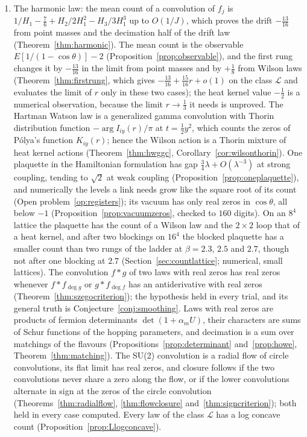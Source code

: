 \begin{enumerate}
\item The harmonic law: the mean count of a convolution of $f_j$ is $1/H_1-\frac76+H_2/2H_1^2-H_3/3H_1^3$ up to $O(1/J)$, which proves the drift $-\frac{13}{16}$ from point masses and the decimation half of the drift law (Theorem~\ref{thm:harmonic}). The mean count is the observable $E[1/(1-\cos\theta)]-2$ (Proposition~\ref{prop:observable}), and the first rung changes it by $-\frac{13}{16}$ in the limit from point masses and by $+\frac18$ from Wilson laws (Theorem~\ref{thm:firstrung}, which gives $-\frac{13}{16}+\frac{15}{16}r+o(1)$ on the class $\mathcal L$ and evaluates the limit of $r$ only in these two cases); the heat kernel value $-\frac12$ is a numerical observation, because the limit $r\to\frac13$ it needs is unproved. The Hartman Watson law is a generalized gamma convolution with Thorin distribution function $-\arg I_{iy}(r)/\pi$ at $t=\frac12y^2$, which counts the zeros of P\'olya's function $K_{iy}(r)$; hence the Wilson action is a Thorin mixture of heat kernel actions (Theorem~\ref{thm:hwggc}, Corollary~\ref{cor:wilsonthorin}). One plaquette in the Hamiltonian formulation has gap $\frac34\lambda+O(\lambda^{-3})$ at strong coupling, tending to $\sqrt2$ at weak coupling (Proposition~\ref{prop:oneplaquette}), and numerically the levels a link needs grow like the square root of its count (Open problem~\ref{op:registers}); its vacuum has only real zeros in $\cos\theta$, all below $-1$ (Proposition~\ref{prop:vacuumzeros}, checked to $160$ digits). On an $8^4$ lattice the plaquette has the count of a Wilson law and the $2\times2$ loop that of a heat kernel, and after two blockings on $16^4$ the blocked plaquette has a smaller count than two rungs of the ladder at $\beta=2.3$, $2.5$ and $2.7$, though not after one blocking at $2.7$ (Section~\ref{sec:countlattice}; numerical, small lattices). The convolution $f*g$ of two laws with real zeros has real zeros whenever $f*f_{\deg g}$ or $g*f_{\deg f}$ has an antiderivative with real zeros (Theorem~\ref{thm:szegocriterion}); the hypothesis held in every trial, and its general truth is Conjecture~\ref{conj:smoothing}. Laws with real zeros are products of fermion determinants $\det(1+\alpha_mU)$, their characters are sums of Schur functions of the hopping parameters, and decimation is a sum over matchings of the flavours (Propositions~\ref{prop:determinant} and~\ref{prop:howe}, Theorem~\ref{thm:matching}). The SU(2) convolution is a radial flow of circle convolutions, its flat limit has real zeros, and closure follows if the two convolutions never share a zero along the flow, or if the lower convolutions alternate in sign at the zeros of the circle convolution (Theorems~\ref{thm:radialflow}, \ref{thm:flowclosure} and~\ref{thm:signcriterion}); both held in every case computed. Every law of the class $\mathcal L$ has a log concave count (Proposition~\ref{prop:Llogconcave}).

\end{enumerate}
